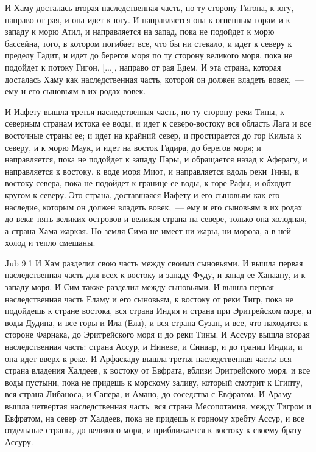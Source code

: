 И Хаму досталась вторая наследственная часть,
по ту сторону Гигона, к югу, направо от рая, и она
идет к югу. И направляется она к огненным горам
и к западу к морю Атил, и направляется на запад,
пока не подойдет к морю бассейна, того, в котором
погибает все, что бы ни стекало, и идет к северу к
пределу Гадит, и идет до берегов моря по ту
сторону великого моря, пока не подойдет к потоку
Гигон, [...], направо от рая Едем. И эта страна,
которая досталась Хаму как наследственная часть,
которой он должен владеть вовек,~--- ему и его
сыновьям в их родах вовек.

И Иафету вышла третья наследственная часть, по
ту сторону реки Тины, к северным странам истока
ее воды, и идет к северо-востоку вся область Лага
и все восточные страны ее; и идет на крайний
север, и простирается до гор Кильта к северу, и к
морю Маук, и идет на восток Гадира, до берегов
моря; и направляется, пока не подойдет к западу
Пары, и обращается назад к Аферагу, и
направляется к востоку, к воде моря Миот, и
направляется вдоль реки Тины, к востоку севера,
пока не подойдет к границе ее воды, к горе Рафы, и
обходит кругом к северу. Это страна, доставшаяся
Иафету и его сыновьям как его наследие, которым
он должен владеть вовек,~--- ему и его сыновьям в их
родах до века: пять великих островов и великая
страна на севере, только она холодная, а страна
Хама жаркая. Но земля Сима не имеет ни жары, ни
мороза, а в ней холод и тепло смешаны.

\vs Jub 9:1
И Хам разделил свою часть между своими
сыновьями. И вышла первая наследственная часть
для всех к востоку и западу Фуду, и запад ее
Ханаану, и к западу моря. И Сим также разделил
между сыновьями. И вышла первая наследственная
часть Еламу и его сыновьям, к востоку от реки
Тигр, пока не подойдешь к стране востока, вся
страна Индия и страна при Эритрейском море, и
воды Дудина, и все горы и Ила (Ела), и вся страна
Сузан, и все, что находится к стороне Фарнака, до
Эритрейского моря и до реки Тины. И Ассуру вышла
вторая наследственная часть: страна Ассур, и
Ниневе, и Синаар, и до границ Индии, и она идет
вверх к реке. И Арфаскаду вышла третья
наследственная часть: вся страна владения
Халдеев, к востоку от Евфрата, вблизи
Эритрейского моря, и все воды пустыни, пока не
придешь к морскому заливу, который смотрит к
Египту, вся страна Либаноса, и Сапера, и Амано, до
соседства с Евфратом. И Араму вышла четвертая
наследственная часть: вся страна Месопотамия,
между Тигром и Евфратом, на север от Халдеев, пока
не придешь к горному хребту Ассур, и все
отдельные страны, до великого моря, и
приближается к востоку к своему брату Ассуру.

